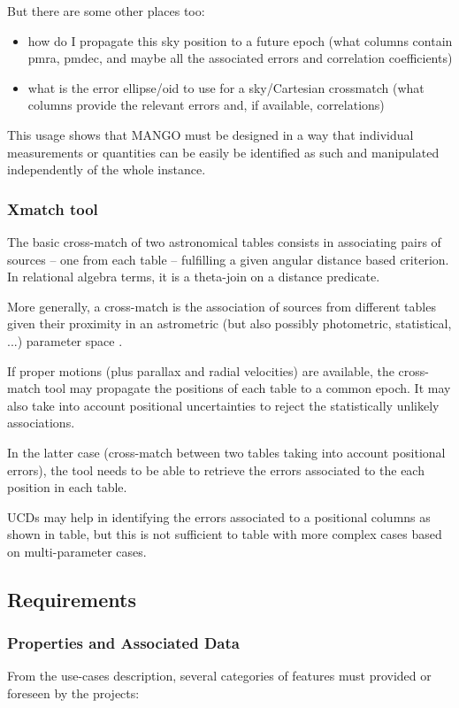 \documentclass[11pt,a4paper]{ivoa}
\begin{document}
But there are some other places too:
\begin{itemize}
    \item how do I propagate this sky position to a future epoch
    (what columns contain pmra, pmdec, and maybe all the
     associated errors and correlation coefficients)

    \item what is the error ellipse/oid to use for a sky/Cartesian crossmatch
    (what columns provide the relevant errors and, if available,
     correlations)
\end{itemize}

This usage shows that MANGO must be designed in a way that individual measurements or quantities
can be easily be identified as such and manipulated independently of the whole instance.

\subsubsection{Xmatch tool }
The basic cross-match of two astronomical tables consists in associating pairs of sources -- one 
from each table -- fulfilling a given angular distance based criterion.
In relational algebra terms, it is a theta-join on a distance predicate.

More generally, a cross-match is the association of sources from different tables given their 
proximity in an astrometric (but also possibly photometric, statistical, ...) parameter
space \citep{2017A&A...597A..89P} .

If proper motions (plus parallax and radial velocities) are available, the cross-match tool 
may propagate the positions of each table to a common epoch.
It may also take into account positional uncertainties to reject the statistically unlikely associations.

In the latter case (cross-match between two tables taking into account positional errors),
the tool needs to be able to retrieve the errors associated to the each position in each table.

UCDs may help in identifying the errors associated to a positional columns as shown in 
table, but this is not sufficient to table with more complex cases based on multi-parameter cases.

\subsection{Requirements}

\subsubsection{Properties and Associated Data}
From the use-cases description, several categories of features must provided or foreseen by the projects:
\end{document}
